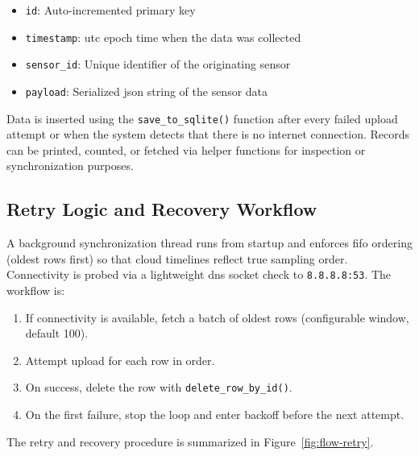 \begin{itemize}
    \item \texttt{id}: Auto-incremented primary key
    \item \texttt{timestamp}: \gls{utc} epoch time when the data was collected
    \item \texttt{sensor\_id}: Unique identifier of the originating sensor
    \item \texttt{payload}: Serialized \gls{json} string of the sensor data
\end{itemize}

Data is inserted using the \texttt{save\_to\_sqlite()} function after every failed upload attempt or when the system detects that there is no internet connection. Records can be printed, counted, or fetched via helper functions for inspection or synchronization purposes.

\subsection{Retry Logic and Recovery Workflow}

A background synchronization thread runs from startup and enforces \acrshort{fifo} ordering (oldest rows first) so that cloud timelines reflect true sampling order. Connectivity is probed via a lightweight \acrshort{dns} socket check to \texttt{8.8.8.8:53}. The workflow is:

\begin{enumerate}
  \item If connectivity is available, fetch a batch of oldest rows (configurable window, default 100).
  \item Attempt upload for each row in order.
  \item On success, delete the row with \texttt{delete\_row\_by\_id()}.
  \item On the first failure, stop the loop and enter backoff before the next attempt.
\end{enumerate}

The retry and recovery procedure is summarized in Figure~\ref{fig:flow-retry}.

